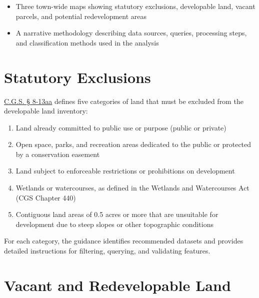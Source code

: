 \documentclass[
  letterpaper,
  DIV=11,
  numbers=noendperiod]{scrreprt}
\providecommand{\tightlist}{%
  \setlength{\itemsep}{0pt}\setlength{\parskip}{0pt}}
\begin{document}
\begin{itemize}
\item
  Three town-wide maps showing statutory exclusions, developable land,
  vacant parcels, and potential redevelopment areas
\item
  A narrative methodology describing data sources, queries, processing
  steps, and classification methods used in the analysis
\end{itemize}

\section*{Statutory Exclusions}\label{statutory-exclusions}


\href{https://cga.ct.gov/2026/sup/chap_124b.htm\#sec_8-13aa}{C.G.S. §
8-13aa} defines five categories of land that must be excluded from the
developable land inventory:

\begin{enumerate}
\def\labelenumi{\Alph{enumi}.}
\tightlist
\item
  Land already committed to public use or purpose (public or private)
\item
  Open space, parks, and recreation areas dedicated to the public or
  protected by a conservation easement
\item
  Land subject to enforceable restrictions or prohibitions on
  development
\item
  Wetlands or watercourses, as defined in the Wetlands and Watercourses
  Act (CGS Chapter 440)
\item
  Contiguous land areas of 0.5 acres or more that are unsuitable for
  development due to steep slopes or other topographic conditions
\end{enumerate}

For each category, the guidance identifies recommended datasets and
provides detailed instructions for filtering, querying, and validating
features.

\section*{Vacant and Redevelopable
Land}\label{vacant-and-redevelopable-land}

\end{document}

